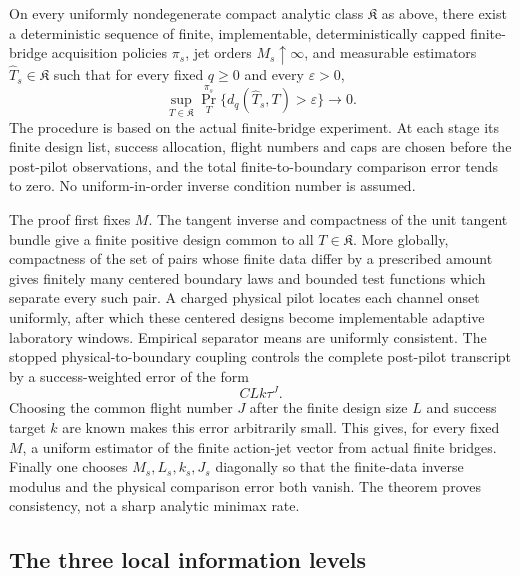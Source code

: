 \begin{theorem}
\label{thm:intro-statistical-flagship}
On every uniformly nondegenerate compact analytic class \(\mathfrak K\) as
above, there exist a deterministic sequence of finite, implementable,
deterministically capped finite-bridge acquisition policies \(\pi_s\), jet
orders \(M_s\uparrow\infty\), and measurable estimators
\(\widehat T_s\in\mathfrak K\) such that for every fixed \(q\ge0\) and every
\(\varepsilon>0\),
\begin{equation}\label{eq:intro-global-consistency}
 \sup_{T\in\mathfrak K}
 \Pr_T^{\pi_s}\{d_q(\widehat T_s,T)>\varepsilon\}
                         \longrightarrow0.
\end{equation}
The procedure is based on the actual finite-bridge experiment.  At each stage
its finite design list, success allocation, flight numbers and caps are chosen
before the post-pilot observations, and the total finite-to-boundary
comparison error tends to zero.  No uniform-in-order inverse condition number
is assumed.
\end{theorem}

The proof first fixes \(M\).  The tangent inverse and compactness of the unit
tangent bundle give a finite positive design common to all
\(T\in\mathfrak K\).  More globally, compactness of the set of pairs whose
finite data differ by a prescribed amount gives finitely many centered
boundary laws and bounded test functions which separate every such pair.  A
charged physical pilot locates each channel onset uniformly, after which these
centered designs become implementable adaptive laboratory windows.  Empirical
separator means are uniformly consistent.  The stopped physical-to-boundary
coupling controls the complete post-pilot transcript by a success-weighted
error of the form
\[
                         C L k\tau^J.
\]
Choosing the common flight number \(J\) after the finite design size \(L\) and
success target \(k\) are known makes this error arbitrarily small.  This gives,
for every fixed \(M\), a uniform estimator of the finite action-jet vector
from actual finite bridges.  Finally one chooses
\(M_s,L_s,k_s,J_s\) diagonally so that the finite-data inverse modulus and the
physical comparison error both vanish.  The theorem proves consistency, not a
sharp analytic minimax rate.

\subsection{The three local information levels}

